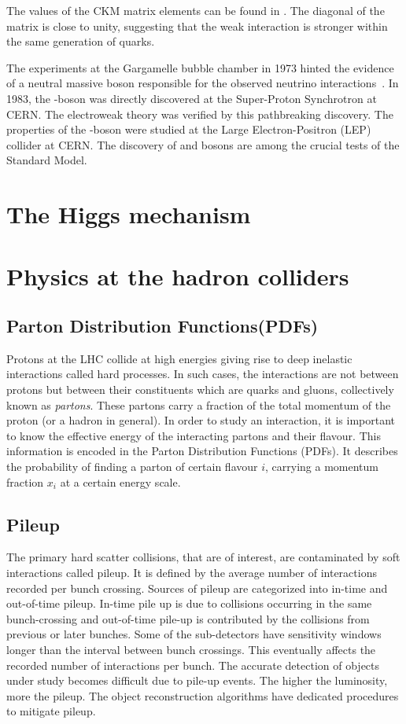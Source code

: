 The values of the CKM matrix elements can be found in \cite{pdg2024}. The diagonal
of the matrix is close to unity, suggesting that the weak interaction is stronger within
the same generation of quarks. 

The experiments at the Gargamelle bubble chamber in 1973 hinted the evidence of a neutral
massive boson responsible for the observed neutrino interactions~\cite{HASERT1973138}. In 1983, the \PZ-boson
was directly discovered at the Super-Proton Synchrotron at CERN. The electroweak theory
was verified by this pathbreaking discovery. The properties of the \PZ-boson were
studied at the Large Electron-Positron (LEP) collider at CERN. The discovery of \PZ and \PW 
bosons are among the crucial tests of the Standard Model. 


\section{The Higgs mechanism}

\section{Physics at the hadron colliders}

\subsection*{Parton Distribution Functions(PDFs)}
Protons at the LHC collide at high energies giving rise to deep inelastic interactions called hard processes.
In such cases, the interactions are not between protons but between their constituents which are
quarks and gluons, collectively known as \textit{partons}. These partons carry a fraction of the total
momentum of the proton (or a hadron in general). In order to study an interaction, it is important to
know the effective energy of the interacting partons and their flavour. This information is encoded in 
the Parton Distribution Functions (PDFs). It describes the probability of finding a parton of 
certain flavour $i$, carrying a momentum fraction $x_i$ at a certain energy scale.

\subsection*{Pileup}
The 
primary hard scatter collisions, that are of interest, are contaminated by soft interactions 
called pileup. It is defined by the average number of interactions
recorded per bunch crossing. Sources of pileup are categorized into in-time and out-of-time pileup. In-time pile up is due to collisions
occurring in the same bunch-crossing and out-of-time pile-up is contributed by the collisions from previous
or later bunches. Some of the sub-detectors have sensitivity windows longer than the interval between
bunch crossings. This eventually affects the recorded number of interactions per bunch. The accurate
detection of objects under study becomes difficult due to pile-up events. The higher the 
luminosity, more the pileup. The object reconstruction algorithms have dedicated procedures 
to mitigate pileup.

